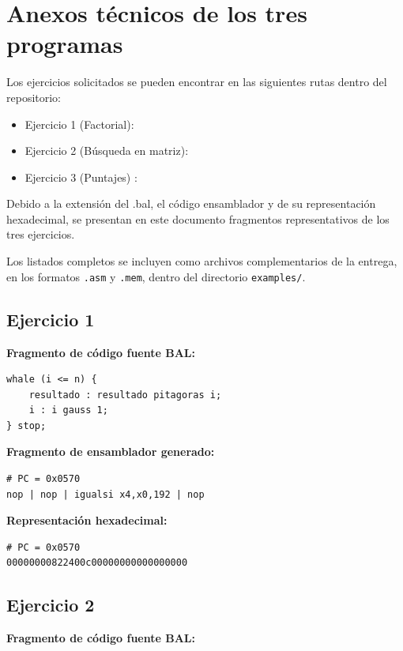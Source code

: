 \newpage

\section{Anexos técnicos de los tres
programas}\label{14-anexos-tuxe9cnicos-de-los-tres-programas}
Los ejercicios solicitados se pueden encontrar en las siguientes rutas dentro del repositorio:
\begin{itemize}
    \item Ejercicio 1 (Factorial): 
    \item Ejercicio 2 (Búsqueda en matriz): 
    \item Ejercicio 3 (Puntajes) : 
\end{itemize}

Debido a la extensión del .bal, el código ensamblador y de su
representación hexadecimal, se presentan en este
documento fragmentos representativos de los tres
ejercicios.

Los listados completos se incluyen como archivos
complementarios de la entrega, en los formatos
\texttt{.asm} y \texttt{.mem}, dentro del directorio
\texttt{examples/}.
\newpage
\subsection{Ejercicio 1}
\textbf{Fragmento de código fuente BAL:}

\begin{lstlisting}[caption={Ejercicio 1: ciclo del factorial}]
whale (i <= n) {
    resultado : resultado pitagoras i;
    i : i gauss 1;
} stop;
\end{lstlisting}

\textbf{Fragmento de ensamblador generado:}

\begin{lstlisting}[caption={Ejercicio 1: salto condicional VLIW}]
# PC = 0x0570
nop | nop | igualsi x4,x0,192 | nop
\end{lstlisting}

\textbf{Representación hexadecimal:}

\begin{lstlisting}[caption={Ejercicio 1: bundle hexadecimal}]
# PC = 0x0570
00000000822400c00000000000000000
\end{lstlisting}

\subsection{Ejercicio 2}
\textbf{Fragmento de código fuente BAL:}

